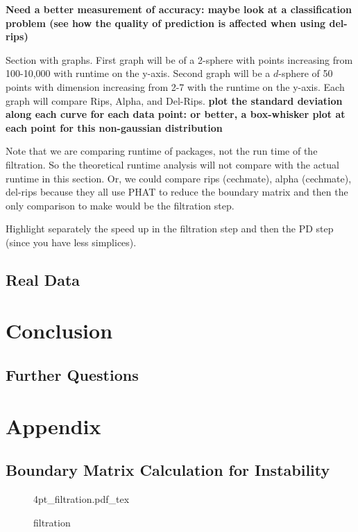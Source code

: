 \documentclass[letterpaper,titlepage]{article}
\newcommand{\incfig}[1]{%
    \def\svgwidth{\columnwidth}
    {#1.pdf_tex}
}
\begin{document}
    \textbf{Need a better measurement of accuracy: maybe look at a classification problem (see how the quality of prediction is affected when using del-rips)}

    Section with graphs. First graph will be of a 2-sphere with points increasing from 100-10,000 with runtime on the y-axis. Second graph will be a $d$-sphere of 50 points with dimension increasing from 2-7 with the runtime on the y-axis. Each graph will compare Rips, Alpha, and Del-Rips.
    \textbf{plot the standard deviation along each curve for each data point: or better, a box-whisker plot at each point for this non-gaussian distribution}
    
    Note that we are comparing runtime of packages, not the run time of the filtration. So the theoretical runtime analysis will not compare with the actual runtime in this section. Or, we could compare rips (cechmate), alpha (cechmate), del-rips because they all use PHAT to reduce the boundary matrix and then the only comparison to make would be the filtration step.
    
    Highlight separately the speed up in the filtration step and then the PD step (since you have less simplices).


\subsection{Real Data}



\section{Conclusion}



\subsection{Further Questions}

\section{Appendix}

\subsection{Boundary Matrix Calculation for Instability}\label{boundary_mat}

\begin{figure}[ht]
    \centering
    \incfig{4pt_filtration}
    \caption{filtration}
    \label{fig:4pt_filtration}
\end{figure}
\end{document}
